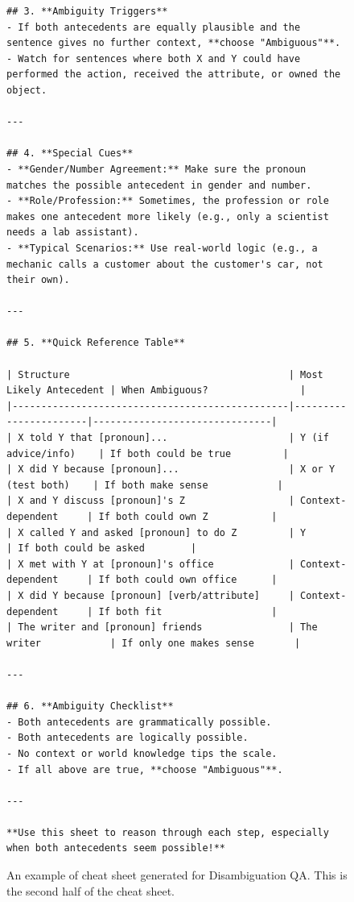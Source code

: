 \begin{figure}[t]
\centering
\begin{tcolorbox}[title=Cheat Sheet for Disambiguation QA (2/2), colback=gray!10, colframe=black!70, boxrule=0.5pt, top=0pt, bottom=0pt, left=0pt, right=0pt, arc=0.8mm, width=1.0\textwidth]
\scriptsize
\begin{lstlisting}
## 3. **Ambiguity Triggers**
- If both antecedents are equally plausible and the sentence gives no further context, **choose "Ambiguous"**.
- Watch for sentences where both X and Y could have performed the action, received the attribute, or owned the object.

---

## 4. **Special Cues**
- **Gender/Number Agreement:** Make sure the pronoun matches the possible antecedent in gender and number.
- **Role/Profession:** Sometimes, the profession or role makes one antecedent more likely (e.g., only a scientist needs a lab assistant).
- **Typical Scenarios:** Use real-world logic (e.g., a mechanic calls a customer about the customer's car, not their own).

---

## 5. **Quick Reference Table**

| Structure                                      | Most Likely Antecedent | When Ambiguous?                |
|------------------------------------------------|-----------------------|-------------------------------|
| X told Y that [pronoun]...                     | Y (if advice/info)    | If both could be true         |
| X did Y because [pronoun]...                   | X or Y (test both)    | If both make sense            |
| X and Y discuss [pronoun]'s Z                  | Context-dependent     | If both could own Z           |
| X called Y and asked [pronoun] to do Z         | Y                     | If both could be asked        |
| X met with Y at [pronoun]'s office             | Context-dependent     | If both could own office      |
| X did Y because [pronoun] [verb/attribute]     | Context-dependent     | If both fit                   |
| The writer and [pronoun] friends               | The writer            | If only one makes sense       |

---

## 6. **Ambiguity Checklist**
- Both antecedents are grammatically possible.
- Both antecedents are logically possible.
- No context or world knowledge tips the scale.
- If all above are true, **choose "Ambiguous"**.

---

**Use this sheet to reason through each step, especially when both antecedents seem possible!**
\end{lstlisting}
\end{tcolorbox}
\caption{
An example of cheat sheet generated for Disambiguation QA.
This is the second half of the cheat sheet.
}
\label{fig:cheat_sheet_disamb_2}
\end{figure}